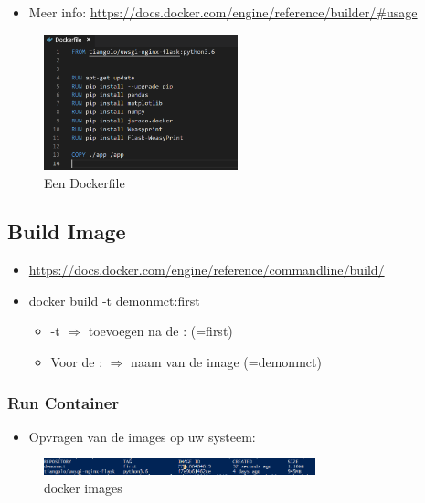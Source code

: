 \documentclass{article}
\begin{document}
\begin{itemize}
    \item Meer info: \url{https://docs.docker.com/engine/reference/builder/\#usage}
\end{itemize}

\begin{figure}[H]
    \centering
    \includegraphics[width=0.5\textwidth]{dockerfile-5.png}
    \caption{Een Dockerfile}
\end{figure}

\subsection{Build Image}


\begin{itemize}
    \item \url{https://docs.docker.com/engine/reference/commandline/build/}
    \item docker build -t demonmct:first
    \begin{itemize}
        \item -t $\Rightarrow$ toevoegen na de : (=first)
        \item Voor de : $\Rightarrow$ naam van de image (=demonmct)
    \end{itemize}
\end{itemize}

\subsubsection{Run Container}

\begin{itemize}
    \item Opvragen van de images op uw systeem:
\end{itemize}

\begin{figure}[H]
    \centering
    \includegraphics[width=0.7\textwidth]{docker-runcontainer-1.png}
    \caption{docker images}
\end{figure}
\end{document}
